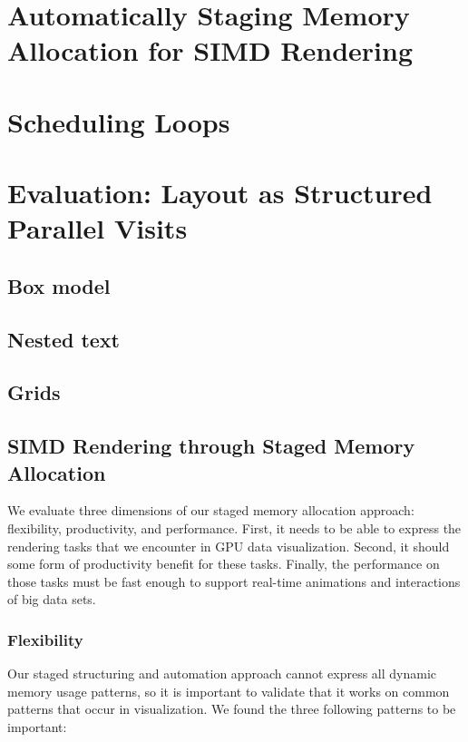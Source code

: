 \section{Automatically Staging Memory Allocation for SIMD Rendering}


\section{Scheduling Loops}


\section{Evaluation: Layout as Structured Parallel Visits}
\subsection{Box model}
\subsection{Nested text}
\subsection{Grids}


\subsection{SIMD Rendering through Staged Memory Allocation}
We evaluate three dimensions of our staged memory allocation approach: flexibility, productivity, and performance. First, it needs to be able to express the rendering tasks that we encounter in GPU data visualization. Second, it should some form of productivity benefit for these tasks. Finally, the performance on those tasks must be fast  enough to support real-time animations and interactions of big data sets.

\subsubsection{Flexibility}
Our staged structuring and automation approach cannot express all dynamic memory usage patterns, so it is important to validate that it works on common patterns that occur in visualization. We found the three following patterns to be important:


